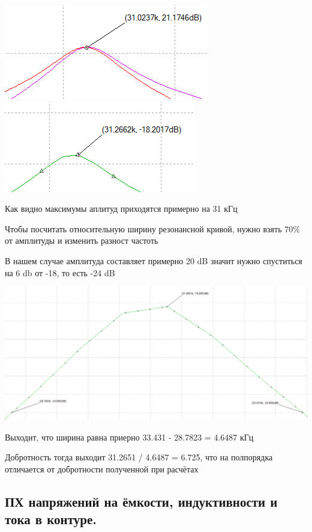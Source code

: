 \documentclass[12pt,a4paper]{article}
\begin{document}
			\newpage
	
			\includegraphics[width=0.5\linewidth]{src/MFH_max_1}
			\includegraphics[width=0.5\linewidth]{src/MFH_max_2}
			
			Как видно максимумы аплитуд приходятся примерно на 31 кГц
		
			Чтобы посчитать относительную ширину резонансной кривой, нужно взять 70\% от амплитуды и изменить разност частоть
			
			В нашем случае амплитуда составляет примерно 20 dB значит нужно спуститься на 6 db от -18, то есть -24 dB
			
			\includegraphics[width=1\linewidth]{src/MFH_current_weight}
			
			Выходит, что ширина равна приерно 33.431 - 28.7823 = 4.6487 кГц
			
			Добротность тогда выходит 31.2651 / 4.6487 = 6.725, что на полпорядка отличается от добротности полученной при расчётах
			
			\newpage			

		\subsection{ПХ напряжений на ёмкости, индуктивности и тока в контуре.\newline}
		
\end{document}
